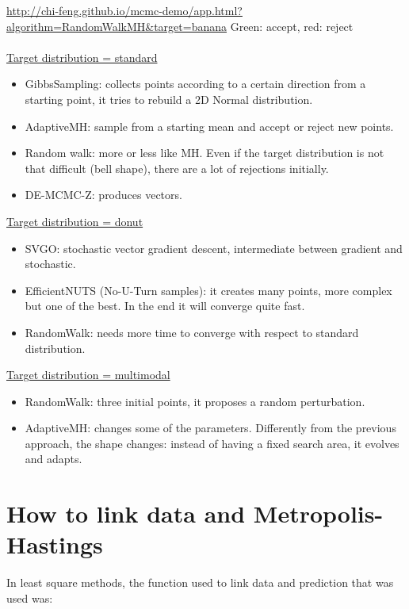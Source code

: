   \url{http://chi-feng.github.io/mcmc-demo/app.html?algorithm=RandomWalkMH\&target=banana}
  \noindent
  Green: accept, red: reject
  \\
  \\
  \noindent
  \underline{Target distribution = standard}

  \begin{itemize}
  \tightlist
  \item
    GibbsSampling: collects points according to a certain direction from a
    starting point, it tries to rebuild a 2D Normal distribution.
  \item
    AdaptiveMH: sample from a starting mean and accept or reject new
    points.
  \item
    Random walk: more or less like MH. Even if the target distribution is
    not that difficult (bell shape), there are a lot of rejections
    initially.
  \item
    DE-MCMC-Z: produces vectors.
  \end{itemize}
  \noindent
  \underline{Target distribution = donut}

  \begin{itemize}
  \tightlist
  \item
    SVGO: stochastic vector gradient descent, intermediate between
    gradient and stochastic.
  \item
    EfficientNUTS (No-U-Turn samples): it creates many points, more
    complex but one of the best. In the end it will converge quite fast.
  \item
    RandomWalk: needs more time to converge with respect to standard
    distribution.
  \end{itemize}
  \noindent
  \underline{Target distribution = multimodal}

  \begin{itemize}
  \tightlist
  \item
    RandomWalk: three initial points, it proposes a random perturbation.
  \item
    AdaptiveMH: changes some of the parameters. Differently from the
    previous approach, the shape changes: instead of having a fixed search
    area, it evolves and adapts.
  \end{itemize}


\section{How to link data and Metropolis-Hastings}
In least square methods, the function used to link data and prediction that was used was:

